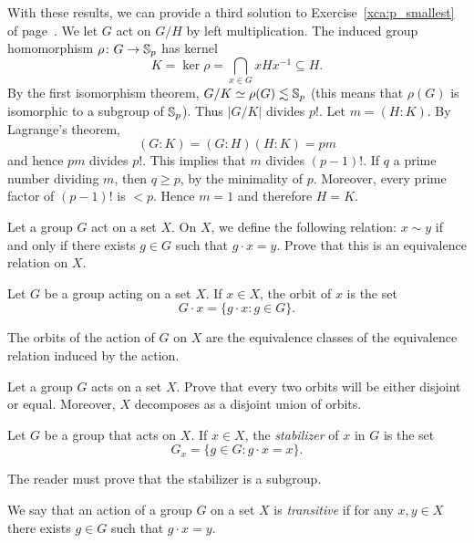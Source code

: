 \begin{optional}
With these results, we can provide a third 
solution to Exercise~\ref{xca:p_smallest} of 
page~\pageref{xca:p_smallest}.
We let  $G$ act on $G/H$ by left multiplication. 
The induced group homomorphism  $\rho\colon G\to\mathbb{S}_p$ has 
kernel 
\[
K=\ker\rho=\bigcap_{x\in G}xHx^{-1}\subseteq H.
\]
By the first isomorphism theorem, 
$G/K\simeq\rho(G)\lesssim\mathbb{S}_p$ (this means that 
$\rho(G)$ is isomorphic to a subgroup of $\mathbb{S}_p$). 
Thus $|G/K|$ divides $p!$.
Let $m=(H:K)$. By Lagrange's theorem,
\[
(G:K)=(G:H)(H:K)=pm
\]
and hence $pm$ divides $p!$. This implies that $m$ divides $(p-1)!$. If $q$ a prime number dividing 
 $m$, then $q\geq p$, by the minimality of $p$. Moreover, 
 every prime factor of $(p-1)!$ is 
 $<p$. Hence $m=1$ and therefore $H=K$.
\end{optional}
 
\begin{exercise}
    Let a group $G$ act on a set $X$. 
    On $X$, we define the following relation: $x\sim y$ if and only if
    there exists $g\in G$ such that $g\cdot x=y$. Prove 
    that this is an equivalence relation on $X$. 
\end{exercise}

\begin{definition}
Let $G$ be a group acting on a set $X$. If $x\in X$, the
orbit of $x$ is the set
\[
G\cdot x=\{g\cdot x:g\in G\}.
\]
\end{definition}

The orbits of the action of $G$ on $X$ are 
the equivalence classes of the equivalence 
relation induced by the action. 

\begin{exercise}
    Let a group $G$ acts on a set $X$. Prove that 
    every two orbits will be either disjoint or equal. Moreover, 
    $X$ decomposes as a disjoint union of orbits. 
\end{exercise}

\begin{definition}
        Let $G$ be a group that acts on $X$. If $x\in X$, the \emph{stabilizer} of $x$ in $G$
        is the set   
        \[
        G_x=\{g\in G:g\cdot x=x\}.
        \]
\end{definition}

The reader must prove that the stabilizer is a subgroup. 

\begin{definition}
We say that an action of a group $G$ on a set $X$
is \emph{transitive} if for any $x,y\in X$ there exists $g\in G$ such that $g\cdot x=y$.
\end{definition}

